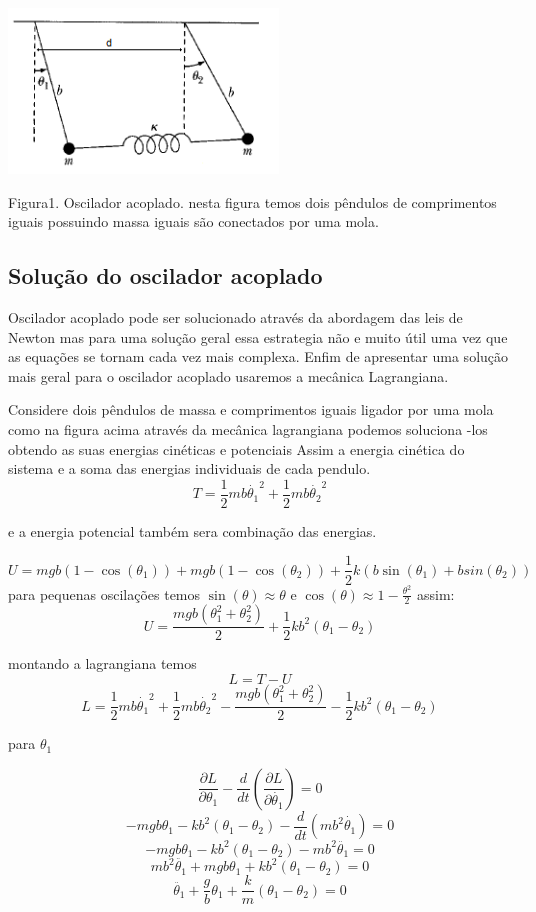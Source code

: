 \documentclass[a4paper]{article} %
\begin{document}
\begin{center}
	\includegraphics[width=2.82in, height=1.73in, keepaspectratio=false]{Oscilador.PNG}
	
	\scriptsize{ Figura1. Oscilador acoplado. nesta figura temos dois pêndulos de comprimentos iguais possuindo massa iguais são conectados por uma mola. }
\end{center}

\subsection{Solução do oscilador acoplado}

Oscilador acoplado pode ser solucionado através da abordagem das leis de Newton mas para uma solução geral essa estrategia não e muito útil uma vez que as equações se tornam cada vez mais complexa. Enfim de apresentar uma solução mais geral para o oscilador acoplado usaremos a mecânica Lagrangiana.

Considere dois pêndulos de massa e comprimentos iguais ligador por uma mola como na figura acima através da mecânica lagrangiana podemos soluciona -los obtendo as suas energias cinéticas e potenciais
Assim a energia cinética do sistema e a soma das energias individuais de cada pendulo.
\[T = \frac{1}{2}mb\dot{\theta_1}^2 + \frac{1}{2}mb\dot{\theta_2}^2\] 

e a energia potencial também sera combinação das energias.

\[U = mgb(1-\cos(\theta_1)) + mgb(1 -\cos(\theta_2))+\frac{1}{2}k(b\sin(\theta_1)+bsin(\theta_2))\]   
para pequenas oscilações temos $\sin(\theta) \approx \theta$ e $\cos(\theta) \approx 1 - \frac{\theta^2}{2}$ assim:
\[U = \frac{mgb(\theta_1^2+\theta_2^2)}{2} +\frac{1}{2}kb^2(\theta_1-\theta_2)\]

montando a lagrangiana temos
\[L = T - U\]
\[L = \frac{1}{2}mb\dot{\theta_1}^2 + \frac{1}{2}mb\dot{\theta_2}^2 - \frac{mgb(\theta_1^2+\theta_2^2)}{2} -\frac{1}{2}kb^2(\theta_1-\theta_2)\]

para $\theta_1$

\[\frac{\partial L}{\partial \theta_1} - \frac{d}{dt}\left(\frac{\partial L}{\partial \dot{\theta_1}}\right) = 0\]
\[-mgb\theta_1 -kb^2(\theta_1-\theta_2) -\frac{d}{dt}(mb^2\dot{\theta_1}) = 0\]
\[-mgb\theta_1 -kb^2(\theta_1-\theta_2) -mb^2\ddot{\theta_1} = 0\]
\[mb^2\ddot{\theta_1} +mgb\theta_1 +kb^2(\theta_1-\theta_2) = 0\]
\begin{equation}
	\ddot{\theta_1} + \frac{g}{b}\theta_1 + \frac{k}{m}(\theta_1-\theta_2) = 0
\end{equation}
\end{document}
